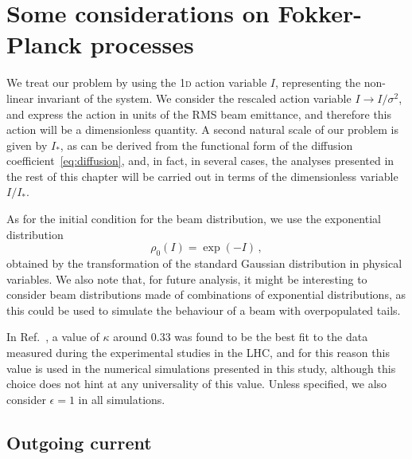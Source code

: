 \section{Some considerations on Fokker-Planck processes}\label{sec:some_considerations}

We treat our problem by using the 1\textsc{d} action variable $I$, representing the non-linear invariant of the system. We consider the rescaled action variable $I \to I/\sigma^2$, and express the action in units of {the RMS} beam emittance, and therefore this action will be a dimensionless quantity. {A second natural scale of our problem is given by $I_\ast$, as can be derived from the functional form of the diffusion coefficient~\eqref{eq:diffusion}, and, in fact, in several cases, the analyses presented in the rest of this chapter will be carried out in terms of the dimensionless variable $I/I_\ast$.}

As for the initial condition for the beam distribution, we use the exponential distribution
\begin{equation}
    \rho_0(I) = \exp(-I) \, , 
    \label{eq:initial_distribution}
\end{equation}
obtained by the transformation of the standard Gaussian distribution in physical variables. We also note that, for future analysis, it might be interesting to consider beam distributions made of combinations of exponential distributions, as this could be used to simulate the behaviour of a beam with overpopulated tails.

In Ref.~\cite{bazzani2020diffusion}, a value of $\kappa$ around $0.33$ was found to be the best fit to the data measured during the experimental studies in the LHC, and for this reason this value is used in the numerical simulations presented in this study, {although this choice does not hint at any universality of this value.} Unless specified, we also consider $\epsilon=1$ in all simulations.

\subsection{Outgoing current}\label{subsec:outgoing_current}


